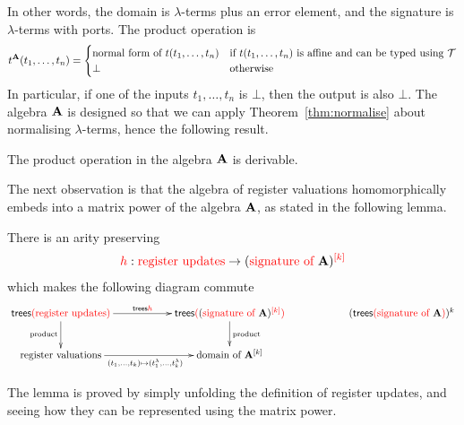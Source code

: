 In other words, the domain is $\lambda$-terms plus an error element, and the signature is $\lambda$-terms  with ports. The   product operation is 
\begin{align*}
t^\alg(t_1,\ldots,t_n) = \begin{cases}
    \text{normal form of $t(t_1,\ldots,t_n)$} & \text{if $t(t_1,\ldots,t_n)$ is affine and can be typed using $\Tt$}\\
    \bot & \text{otherwise}
\end{cases}
\end{align*}
In particular, if one of the inputs $t_1,\ldots,t_n$ is $\bot$, then the output is also $\bot$.  The algebra $\alg$ is designed so that we can apply Theorem~\ref{thm:normalise} about normalising $\lambda$-terms, hence the following result.

\begin{corollary}\label{lem:balg}
    The product operation in the  algebra $\alg$ is derivable.
\end{corollary}

The next  observation is that the algebra of register valuations homomorphically embeds into a matrix power of the algebra $\alg$, as stated in the following lemma. 
\begin{lemma}\label{lem:hom-matrix}
    There is an arity preserving 
    \begin{align*}
    \ranked h : \regups \to \mati k {(\algops \alg)}
    \end{align*}
    which makes the following diagram commute
    \begin{align*}
    \xymatrix@C=2cm{
        \treepar {\regups} \ar[r]^-{\trees \ranked h}\ar[d]_{\text{product}} & \treepar {\mati k {(\algops \alg)}}\ar[d]^{\text{product}}  & (\treepar {\algops \alg})^k\\
        \regvalss \ar[r]_{(t_1,\ldots,t_k) \mapsto (t^\lambda_1,\ldots,t^\lambda_k)}& \algdom {\alg^{[k]}}
    }
    \end{align*} 
\end{lemma}
The lemma is proved by simply unfolding the definition of register updates, and seeing how they can be represented using the matrix power.





